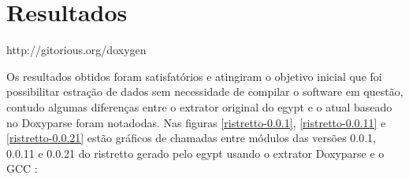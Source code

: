 \section{Resultados}

http://gitorious.org/doxygen

Os resultados obtidos foram satisfatórios e atingiram o objetivo inicial que
foi possibilitar estração de dados sem necessidade de compilar o software em
questão, contudo algumas diferenças entre o extrator original do egypt e o
atual baseado no Doxyparse foram notadodas. Nas figuras \ref{ristretto-0.0.1},
\ref{ristretto-0.0.11} e \ref{ristretto-0.0.21} estão gráficos de chamadas
entre módulos das versões 0.0.1, 0.0.11 e 0.0.21 do ristretto gerado pelo egypt
usando o extrator Doxyparse e o GCC :

\begin{figure}
\center
{}
\qquad
{}
\end{figure}
